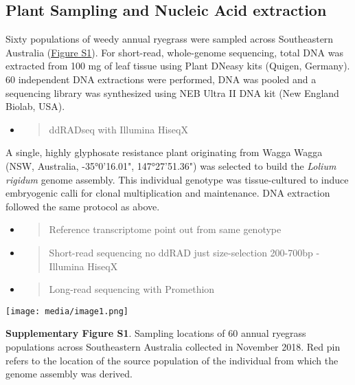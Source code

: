 \hypertarget{plant-sampling-and-nucleic-acid-extraction}{%
\subsection{Plant Sampling and Nucleic Acid
extraction}\label{plant-sampling-and-nucleic-acid-extraction}}

Sixty populations of weedy annual ryegrass were sampled across
Southeastern Australia (\protect\hyperlink{xpuavhcd9n22}{\uline{Figure}
\uline{S1}}). For short-read, whole-genome sequencing, total DNA was
extracted from 100 mg of leaf tissue using Plant DNeasy kits (Quigen,
Germany). 60 independent DNA extractions were performed, DNA was pooled
and a sequencing library was synthesized using NEB Ultra II DNA kit (New
England Biolab, USA).

\begin{itemize}
\item
  \begin{quote}
  ddRADseq with Illumina HiseqX
  \end{quote}
\end{itemize}

A single, highly glyphosate resistance plant originating from Wagga
Wagga (NSW, Australia, -35°0'16.01", 147°27'51.36") was selected to
build the \emph{Lolium rigidum} genome assembly. This individual
genotype was tissue-cultured to induce embryogenic calli for clonal
multiplication and maintenance. DNA extraction followed the same
protocol as above.

\begin{itemize}
\item
  \begin{quote}
  Reference transcriptome point out from same genotype
  \end{quote}
\item
  \begin{quote}
  Short-read sequencing no ddRAD just size-selection 200-700bp -
  Illumina HiseqX
  \end{quote}
\item
  \begin{quote}
  Long-read sequencing with Promethion
  \end{quote}
\end{itemize}

\texttt{[image: media/image1.png]}

\textbf{Supplementary Figure S1}. Sampling locations of 60 annual
ryegrass populations across Southeastern Australia collected in November
2018. Red pin refers to the location of the source population of the
individual from which the genome assembly was derived.

